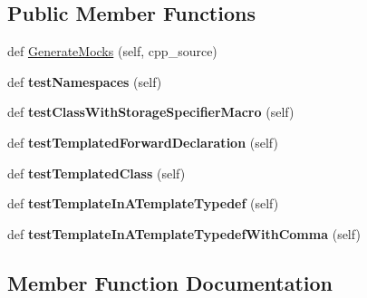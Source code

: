 \subsection*{Public Member Functions}
\begin{DoxyCompactItemize}
\item 
def \hyperlink{classcpp_1_1gmock__class__test_1_1_generate_mocks_test_afdce6749dca14c1aa90762d389d92c87}{Generate\+Mocks} (self, cpp\+\_\+source)
\item 
\mbox{\label{classcpp_1_1gmock__class__test_1_1_generate_mocks_test_a706812da9e8f79a689c707b4032db2d2}} 
def {\bfseries test\+Namespaces} (self)
\item 
\mbox{\label{classcpp_1_1gmock__class__test_1_1_generate_mocks_test_aba1ab8ae8a897ea9c22a47bcd1524254}} 
def {\bfseries test\+Class\+With\+Storage\+Specifier\+Macro} (self)
\item 
\mbox{\label{classcpp_1_1gmock__class__test_1_1_generate_mocks_test_a18cb0f03ecd4e54d0f787694c1513731}} 
def {\bfseries test\+Templated\+Forward\+Declaration} (self)
\item 
\mbox{\label{classcpp_1_1gmock__class__test_1_1_generate_mocks_test_a4098c99b66f0cbea7be9e66352a20f4d}} 
def {\bfseries test\+Templated\+Class} (self)
\item 
\mbox{\label{classcpp_1_1gmock__class__test_1_1_generate_mocks_test_a32a2840352d970c631d7be1b6d1970e6}} 
def {\bfseries test\+Template\+In\+A\+Template\+Typedef} (self)
\item 
\mbox{\label{classcpp_1_1gmock__class__test_1_1_generate_mocks_test_a67d1336b8782257fcfcdbda8c8d4f794}} 
def {\bfseries test\+Template\+In\+A\+Template\+Typedef\+With\+Comma} (self)
\end{DoxyCompactItemize}


\subsection{Member Function Documentation}
\mbox{\label{classcpp_1_1gmock__class__test_1_1_generate_mocks_test_afdce6749dca14c1aa90762d389d92c87}} 
